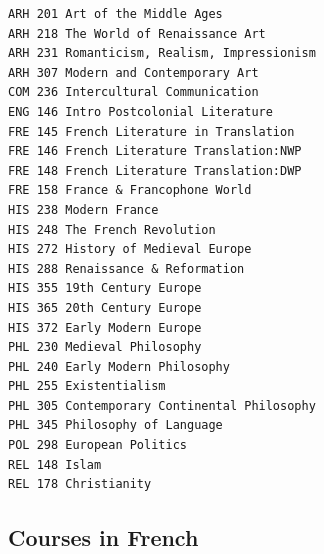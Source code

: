 \documentclass[
  letterpaper,
]{scrbook}
\begin{document}
\begin{verbatim}
ARH 201 Art of the Middle Ages
ARH 218 The World of Renaissance Art
ARH 231 Romanticism, Realism, Impressionism
ARH 307 Modern and Contemporary Art
COM 236 Intercultural Communication
ENG 146 Intro Postcolonial Literature
FRE 145 French Literature in Translation
FRE 146 French Literature Translation:NWP
FRE 148 French Literature Translation:DWP
FRE 158 France & Francophone World
HIS 238 Modern France
HIS 248 The French Revolution
HIS 272 History of Medieval Europe
HIS 288 Renaissance & Reformation
HIS 355 19th Century Europe
HIS 365 20th Century Europe
HIS 372 Early Modern Europe
PHL 230 Medieval Philosophy
PHL 240 Early Modern Philosophy
PHL 255 Existentialism
PHL 305 Contemporary Continental Philosophy
PHL 345 Philosophy of Language
POL 298 European Politics
REL 148 Islam
REL 178 Christianity
\end{verbatim}

\hypertarget{courses-in-french}{%
\subsection{Courses in French}\label{courses-in-french}}
\end{document}
